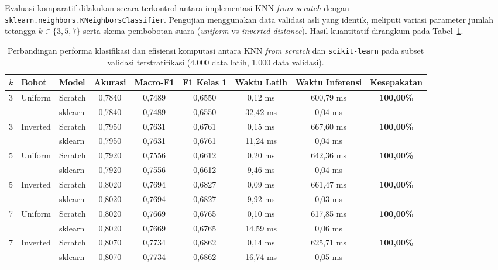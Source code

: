 Evaluasi komparatif dilakukan secara terkontrol antara implementasi KNN \textit{from scratch}
dengan \texttt{sklearn.neighbors.KNeighborsClassifier}. Pengujian menggunakan data validasi
asli yang identik, meliputi variasi parameter jumlah tetangga $k \in \{3, 5, 7\}$ serta skema
pembobotan suara (\textit{uniform} vs \textit{inverted distance}). Hasil kuantitatif dirangkum
pada Tabel~\ref{tab:knn-comparison}.

\begin{table}[htbp]
  \centering
  \caption{Perbandingan performa klasifikasi dan efisiensi komputasi antara KNN \textit{from scratch}
  dan \texttt{scikit-learn} pada subset validasi terstratifikasi (4.000 data latih, 1.000 data validasi).}
  \label{tab:knn-comparison}
  \footnotesize
  \begin{tabular}{lllcccccc}
    \toprule
    $k$ & Bobot & Model & Akurasi & Macro-F1 & F1 Kelas 1 & Waktu Latih & Waktu Inferensi & Kesepakatan \\
    \midrule
    3 & Uniform  & Scratch & 0,7840 & 0,7489 & 0,6550 & 0,12 ms & 600,79 ms & \textbf{100,00\%} \\
      &          & sklearn & 0,7840 & 0,7489 & 0,6550 & 32,42 ms & 0,04 ms  & \\
    \midrule
    3 & Inverted & Scratch & 0,7950 & 0,7631 & 0,6761 & 0,15 ms & 667,60 ms & \textbf{100,00\%} \\
      &          & sklearn & 0,7950 & 0,7631 & 0,6761 & 11,24 ms & 0,04 ms  & \\
    \midrule
    5 & Uniform  & Scratch & 0,7920 & 0,7556 & 0,6612 & 0,20 ms & 642,36 ms & \textbf{100,00\%} \\
      &          & sklearn & 0,7920 & 0,7556 & 0,6612 & 9,46 ms  & 0,04 ms  & \\
    \midrule
    5 & Inverted & Scratch & 0,8020 & 0,7694 & 0,6827 & 0,09 ms & 661,47 ms & \textbf{100,00\%} \\
      &          & sklearn & 0,8020 & 0,7694 & 0,6827 & 9,92 ms  & 0,03 ms  & \\
    \midrule
    7 & Uniform  & Scratch & 0,8020 & 0,7669 & 0,6765 & 0,10 ms & 617,85 ms & \textbf{100,00\%} \\
      &          & sklearn & 0,8020 & 0,7669 & 0,6765 & 14,59 ms & 0,06 ms  & \\
    \midrule
    7 & Inverted & Scratch & 0,8070 & 0,7734 & 0,6862 & 0,14 ms & 625,71 ms & \textbf{100,00\%} \\
      &          & sklearn & 0,8070 & 0,7734 & 0,6862 & 16,74 ms & 0,05 ms  & \\
    \bottomrule
  \end{tabular}
\end{table}

